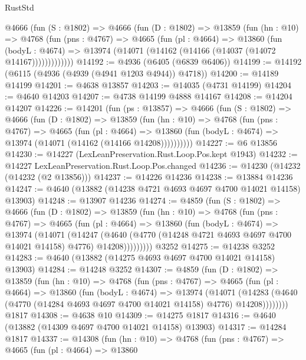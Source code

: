 \begin{lexlean}{RustStd}
\begin{coremodule}
      @4666
        (fun (S : @1802) =>
        @4666
          (fun (D : @1802) =>
          @13859
            (fun (hn : @10) =>
            @4768
              (fun (pns : @4767) =>
              @4665
                (fun (pl : @4664) =>
                @13860
                  (fun (bodyL : @4674) =>
                  @13974 (@14071 (@14162 (@14166 (@14037 (@14072 @14167)))))))))))))
@14192 := @4936 (@6405 (@6839 @6406))
@14199 := @14192 (@6115 (@4936 (@4939 (@4941 @1203 @4944)) @4718))
@14200 := @14189 @14199
@14201 := @4638 @13857
@14203 := @14035 (@4731 @14199)
@14204 := @4640 @14203
@14207 := @4738 @14199 @4888 @14167
@14208 := @14204 @14207
@14226 := @14201
    (fun (ps : @13857) =>
    @4666
      (fun (S : @1802) =>
      @4666
        (fun (D : @1802) =>
        @13859
          (fun (hn : @10) =>
          @4768
            (fun (pns : @4767) =>
            @4665
              (fun (pl : @4664) =>
              @13860 (fun (bodyL : @4674) => @13974 (@14071 (@14162 (@14166 @14208))))))))))
@14227 := @6 @13856
@14230 := @14227 (LexLeanPreservation.Rust.Loop.Pos.kept @1943)
@14232 := @14227 LexLeanPreservation.Rust.Loop.Pos.changed
@14236 := @14230 (@14232 (@14232 (@2 @13856)))
@14237 := @14226 @14236
@14238 := @13884 @14236
@14247 := @4640 (@13882 (@14238 @4721 @4693 @4697 @4700 @14021 @14158) @13903)
@14248 := @13907 @14236
@14274 := @4859
    (fun (S : @1802) =>
    @4666
      (fun (D : @1802) =>
      @13859
        (fun (hn : @10) =>
        @4768
          (fun (pns : @4767) =>
          @4665
            (fun (pl : @4664) =>
            @13860
              (fun (bodyL : @4674) =>
              @13974
                (@14071
                  (@14247
                    (@4640
                      (@4770 (@14248 @4721 @4693 @4697 @4700 @14021 @14158) @4776)
                      @14208)))))))))
    @3252
@14275 := @14238 @3252
@14283 := @4640 (@13882 (@14275 @4693 @4697 @4700 @14021 @14158) @13903)
@14284 := @14248 @3252
@14307 := @4859
    (fun (D : @1802) =>
    @13859
      (fun (hn : @10) =>
      @4768
        (fun (pns : @4767) =>
        @4665
          (fun (pl : @4664) =>
          @13860
            (fun (bodyL : @4674) =>
            @13974
              (@14071
                (@14283 (@4640 (@4770 (@14284 @4693 @4697 @4700 @14021 @14158) @4776) @14208))))))))
    @1817
@14308 := @4638 @10
@14309 := @14275 @1817
@14316 := @4640 (@13882 (@14309 @4697 @4700 @14021 @14158) @13903)
@14317 := @14284 @1817
@14337 := @14308
    (fun (hn : @10) =>
    @4768
      (fun (pns : @4767) =>
      @4665
        (fun (pl : @4664) =>
        @13860

\end{coremodule}
\end{lexlean}

